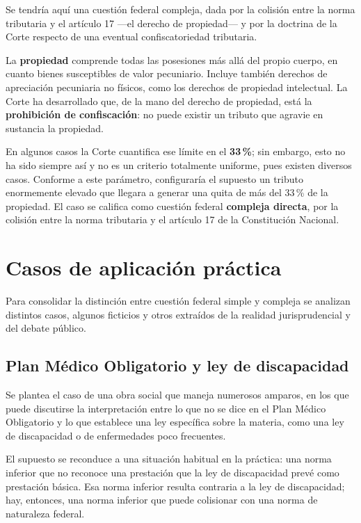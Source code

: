 \documentclass[12pt,oneside]{book}
\begin{document}
Se tendría aquí una cuestión federal compleja, dada por la colisión entre la norma tributaria y el artículo 17 —el derecho de propiedad— y por la doctrina de la Corte respecto de una eventual confiscatoriedad tributaria.

La \textbf{propiedad} comprende todas las posesiones más allá del propio cuerpo, en cuanto bienes susceptibles de valor pecuniario. Incluye también derechos de apreciación pecuniaria no físicos, como los derechos de propiedad intelectual. La Corte ha desarrollado que, de la mano del derecho de propiedad, está la \textbf{prohibición de confiscación}: no puede existir un tributo que agravie en sustancia la propiedad.

En algunos casos la Corte cuantifica ese límite en el \textbf{33\,\%}; sin embargo, esto no ha sido siempre así y no es un criterio totalmente uniforme, pues existen diversos casos. Conforme a este parámetro, configuraría el supuesto un tributo enormemente elevado que llegara a generar una quita de más del 33\,\% de la propiedad. El caso se califica como cuestión federal \textbf{compleja directa}, por la colisión entre la norma tributaria y el artículo 17 de la Constitución Nacional.

\section{Casos de aplicación práctica}
\label{sec:casos}

Para consolidar la distinción entre cuestión federal simple y compleja se analizan distintos casos, algunos ficticios y otros extraídos de la realidad jurisprudencial y del debate público.

\subsection{Plan Médico Obligatorio y ley de discapacidad}

Se plantea el caso de una obra social que maneja numerosos amparos, en los que puede discutirse la interpretación entre lo que no se dice en el Plan Médico Obligatorio y lo que establece una ley específica sobre la materia, como una ley de discapacidad o de enfermedades poco frecuentes.

El supuesto se reconduce a una situación habitual en la práctica: una norma inferior que no reconoce una prestación que la ley de discapacidad prevé como prestación básica. Esa norma inferior resulta contraria a la ley de discapacidad; hay, entonces, una norma inferior que puede colisionar con una norma de naturaleza federal.
\end{document}
